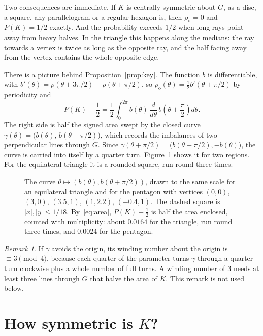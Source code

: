 \documentclass[11pt]{article}
\theoremstyle{remark}
\newtheorem*{remark}{Remark}
\newcommand{\ro}{\rho_{\mathrm o}}
\newcommand{\abs}[1]{\left|#1\right|}
\begin{document}
Two consequences are immediate. If $K$ is centrally symmetric about $G$, as a disc, a square, any
parallelogram or a regular hexagon is, then $\ro=0$ and $P(K)=1/2$ exactly. And the probability
exceeds $1/2$ when long rays point away from heavy halves. In the triangle this happens along the
medians: the ray towards a vertex is twice as long as the opposite ray, and the half facing away from
the vertex contains the whole opposite edge.

There is a picture behind Proposition~\ref{prop:key}. The function $b$ is differentiable, with
$b'(\theta)=\rho(\theta+3\pi/2)-\rho(\theta+\pi/2)$, so $\ro(\theta)=\tfrac12 b'(\theta+\pi/2)$ by
periodicity and
\begin{equation}\label{eq:area}
P(K)-\frac12=\frac12\int_0^{2\pi} b(\theta)\,\frac{d}{d\theta}\,b\!\left(\theta+\frac\pi2\right)d\theta .
\end{equation}
The right side is half the signed area swept by the closed curve $\gamma(\theta)=\bigl(b(\theta),\,
b(\theta+\pi/2)\bigr)$, which records the imbalances of two perpendicular lines through $G$. Since
$\gamma(\theta+\pi/2)=\bigl(b(\theta+\pi/2),-b(\theta)\bigr)$, the curve is carried into itself by a
quarter turn. Figure~\ref{fig:curve} shows it for two regions. For the equilateral triangle it is a
rounded square, run round three times.

\begin{figure}[ht]
\centering

\caption{The curve $\theta\mapsto(b(\theta),b(\theta+\pi/2))$, drawn to the same scale for an
equilateral triangle and for the pentagon with vertices $(0,0)$, $(3,0)$, $(3.5,1)$, $(1,2.2)$,
$(-0.4,1)$. The dashed square is $\abs{x},\abs{y}\le 1/18$. By~\eqref{eq:area}, $P(K)-\tfrac12$ is half
the area enclosed, counted with multiplicity: about $0.0164$ for the triangle, run round three times,
and $0.0024$ for the pentagon.}
\label{fig:curve}
\end{figure}

\begin{remark}
If $\gamma$ avoids the origin, its winding number about the origin is $\equiv 3 \pmod 4$, because each
quarter of the parameter turns $\gamma$ through a quarter turn clockwise plus a whole number of full
turns. A winding number of $3$ needs at least three lines through $G$ that halve the area of $K$. This
remark is not used below.
\end{remark}

\section{How symmetric is \texorpdfstring{$K$}{K}?}\label{sec:sym}
\end{document}

